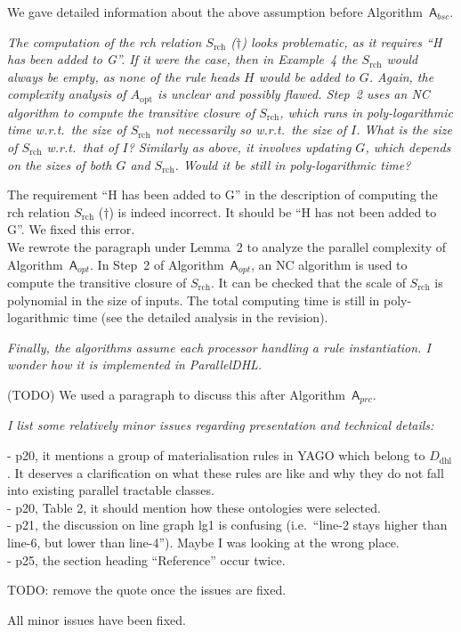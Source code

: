 \documentclass{article}
\let\quoteOld\quote
\let\endquoteOld\endquote
\renewenvironment{quote}{\quoteOld\itshape}{\endquoteOld}
\begin{document}
We gave detailed information about the above assumption before Algorithm~$\mathsf{A}_{bsc}$.


\begin{quote}
The computation of the rch relation $S_{\text{rch}}$ ($\dag$) looks problematic, as it requires ``H has been added to G''. If it were the case, then in Example~4 the $S_{\text{rch}}$ would always be empty, as none of the rule heads $H$ would be added to $G$. Again, the complexity analysis of $A_{\text{opt}}$ is unclear and possibly flawed. Step~2 uses an NC algorithm to compute the transitive closure of $S_{\text{rch}}$, which runs in poly-logarithmic time w.r.t.\ the size of $S_{\text{rch}}$ not necessarily so w.r.t.\ the size of $I$. What is the size of $S_{\text{rch}}$ w.r.t.\ that of $I$? Similarly as above, it involves updating $G$, which depends on the sizes of both $G$ and $S_{\text{rch}}$. Would it be still in poly-logarithmic time?
\end{quote}

The requirement ``H has been added to G'' in the description of computing the rch relation $S_{\text{rch}}$ ($\dag$) is indeed
incorrect. It should be ``H has not been added to G''. We fixed this error.\\

We rewrote the paragraph under Lemma~2 to analyze the parallel complexity of Algorithm~$\mathsf{A}_{opt}$.
In Step~2 of Algorithm~$\mathsf{A}_{opt}$, an NC algorithm is used to compute the transitive closure of $S_{\text{rch}}$.
It can be checked that the scale of $S_{\text{rch}}$ is polynomial in the size of inputs.
The total computing time is still in poly-logarithmic time (see the detailed analysis in the revision).


\begin{quote}
Finally, the algorithms assume each processor handling a rule instantiation. I wonder how it is implemented in ParallelDHL.
\end{quote}

(TODO) We used a paragraph to discuss this after Algorithm~$\mathsf{A}_{prc}$.

\begin{quote}
I list some relatively minor issues regarding presentation and technical details:

- p20, it mentions a group of materialisation rules in YAGO which belong to $D_{\text{dhl}}$. It deserves a clarification on what these rules are like and why they do not fall into existing parallel tractable classes.\\
- p20, Table 2, it should mention how these ontologies were selected. \\
- p21, the discussion on line graph lg1 is confusing (i.e.\ ``line-2 stays higher than line-6, but lower than line-4''). Maybe I was looking at the wrong place. \\
- p25, the section heading ``Reference'' occur twice.
\end{quote}

TODO: remove the quote once the issues are fixed.

All minor issues have been fixed.




\end{document}
